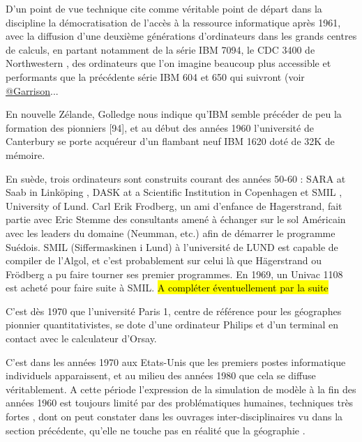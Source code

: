 D'un point de vue technique \textcite{Haggett1969} cite comme véritable point de départ dans la discipline la  démocratisation de l'accès à la ressource informatique après 1961, avec la diffusion d'une deuxième générations d'ordinateurs dans les grands centres de calculs, en partant notamment de la série IBM 7094, le CDC 3400 de Northwestern \autocite[3]{Marble1967}, des ordinateurs que l'on imagine beaucoup plus accessible et performants que la précédente série IBM 604 et 650 qui suivront (voir \href{http://www.aag.org/cs/garrison}{@Garrison}...

En nouvelle Zélande, Golledge nous indique qu'IBM semble précéder de peu la formation des pionniers [94]\autocite{Bailly2000}, et au début des années 1960 l'université de Canterbury se porte acquéreur d'un flambant neuf IBM 1620 doté de 32K de mémoire.

En suède, trois ordinateurs sont construits courant des années 50-60 :  SARA at Saab in Linköping , DASK at a Scientific Institution in Copenhagen et SMIL , University of Lund. \autocite{Persson} Carl Erik Frodberg, un ami d'enfance de Hagerstrand, fait partie avec Eric Stemme des consultants amené à échanger sur le sol Américain avec les leaders du domaine (Neumman, etc.) afin de démarrer le programme Suédois. SMIL (Siffermaskinen i Lund) à l'université de LUND est capable de compiler de l'Algol, et c'est probablement sur celui là que Hägerstrand ou Frödberg a pu faire tourner ses premier programmes. En 1969, un Univac 1108 est acheté pour faire suite à SMIL. \hl{A compléter éventuellement par la suite}

C'est dès 1970 que l'université Paris 1, centre de référence pour les géographes pionnier quantitativistes, se dote d'une ordinateur Philips et d'un terminal en contact avec le calculateur d'Orsay.

C'est dans les années 1970 aux Etats-Unis que les premiers postes informatique individuels apparaissent, et au milieu des années 1980 que cela se diffuse véritablement. A cette période l'expression de la simulation de modèle à la fin des années 1960 est toujours limité par des problématiques humaines, techniques très fortes \autocite{Haggett1969} \autocite[387]{Marble1972}, dont on peut constater dans les ouvrages inter-disciplinaires vu dans la section précédente, qu'elle ne touche pas en réalité que la géographie \autocite{Guetzkow1972}.

